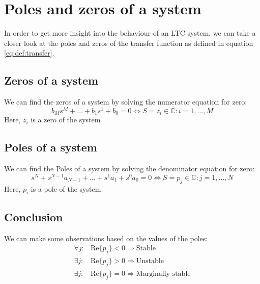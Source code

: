 \documentclass[]{subfiles}
\begin{document}
	\section{Poles and zeros of a system}
	In order to get more insight into the behaviour of an LTC system, we can take a closer look at the poles and zeros of the transfer function as defined in equation \ref{eq:def:transfer}. 
	\subsection{Zeros of a system}
	We can find the zeros of a system by solving the numerator equation for zero:
	\begin{equation}
		b_Ms^M+\ldots+b_1s^1+b_0=0 \Leftrightarrow S=z_i\in \mathbb{C}: i=1,\ldots,M
	\end{equation}
	Here, $z_i$ is a zero of the system
		\subsection{Poles of a system}
	We can find the Poles of a system by solving the denominator equation for zero:
	\begin{equation}
		s^N+s^{N-1}a_{N-1}+\ldots+s^1a_1+s^0a_0=0 \Leftrightarrow S=p_j\in \mathbb{C}: j=1,\ldots,N
	\end{equation}
	Here, $p_i$ is a pole of the system
	\subsection{Conclusion}
	We can make some observations based on the values of the poles:
	\begin{align}
		\forall j:& \text{Re}\{p_j\}<0 \Rightarrow \text{Stable}\\
		\exists j:& \text{Re}\{p_j\}>0 \Rightarrow \text{Unstable}\\
		\exists j:& \text{Re}\{p_j\}=0 \Rightarrow \text{Marginally stable}
	\end{align}
\end{document}
